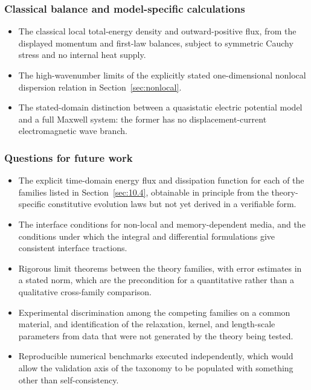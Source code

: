 \label{sec:17.2}

\subsubsection{Classical balance and model-specific calculations}

\begin{itemize}
\item The classical local total-energy density and outward-positive flux, from the displayed momentum and first-law balances, subject to symmetric Cauchy stress and no internal heat supply.
\item The high-wavenumber limits of the explicitly stated one-dimensional nonlocal dispersion relation in Section~\ref{sec:nonlocal}.
\item The stated-domain distinction between a quasistatic electric potential model and a full Maxwell system: the former has no displacement-current electromagnetic wave branch.
\end{itemize}

\subsubsection{Questions for future work}

\begin{itemize}
\item The explicit time-domain energy flux and dissipation function for each of the families listed in Section~\ref{sec:10.4}, obtainable in principle from the theory-specific constitutive evolution laws but not yet derived in a verifiable form.
\item The interface conditions for non-local and memory-dependent media, and the conditions under which the integral and differential formulations give consistent interface tractions.
\item Rigorous limit theorems between the theory families, with error estimates in a stated norm, which are the precondition for a quantitative rather than a qualitative cross-family comparison.
\item Experimental discrimination among the competing families on a common material, and identification of the relaxation, kernel, and length-scale parameters from data that were not generated by the theory being tested.
\item Reproducible numerical benchmarks executed independently, which would allow the validation axis of the taxonomy to be populated with something other than self-consistency.
\end{itemize}

